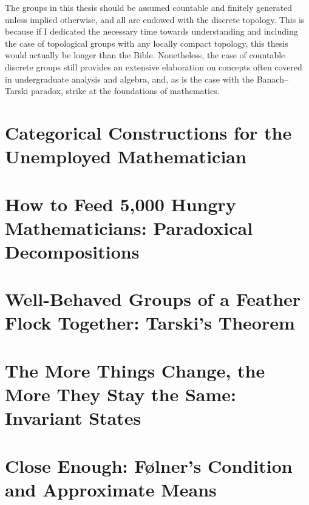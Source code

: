 \documentclass[10pt]{package2}
\begin{document}
The groups in this thesis should be assumed countable and finitely generated unless implied otherwise, and all are endowed with the discrete topology. This is because if I dedicated the necessary time towards understanding and including the case of topological groups with any locally compact topology, this thesis would actually be longer than the Bible. Nonetheless, the case of countable discrete groups still provides an extensive elaboration on concepts often covered in undergraduate analysis and algebra, and, as is the case with the Banach--Tarski paradox, strike at the foundations of mathematics.
\chapter{Categorical Constructions for the Unemployed Mathematician}\label{ch:categorical_constructions}

\chapter{How to Feed 5,000 Hungry Mathematicians: Paradoxical Decompositions}\label{ch:paradoxical_decompositions}

\chapter{Well-Behaved Groups of a Feather Flock Together: Tarski's Theorem}\label{ch:tarskis_theorem}

\chapter{The More Things Change, the More They Stay the Same: Invariant States}\label{ch:invariant_states}

\chapter{Close Enough: Følner's Condition and Approximate Means}\label{ch:folner_condition}

\end{document}
